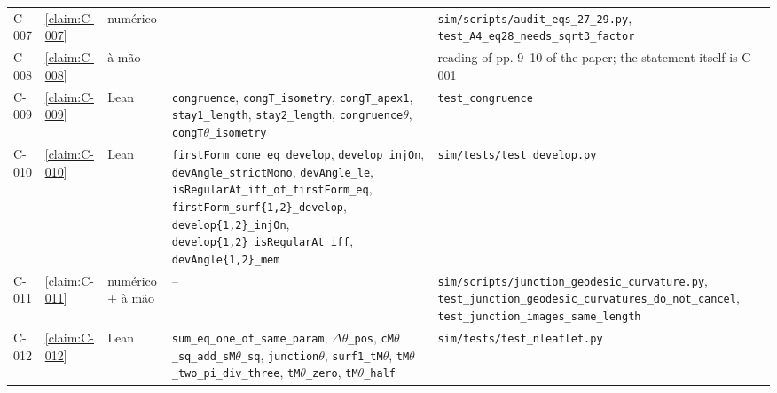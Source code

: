 \begin{longtable}{@{}l>{\raggedright}p{}>{\raggedright}p{}>{\raggedright}p{}>{\raggedright\arraybackslash}p{}@{}}
C-007 & \cref{claim:C-007} & numérico & -- & \texttt{sim/\allowbreak{}scripts/\allowbreak{}audit\_\allowbreak{}eqs\_\allowbreak{}27\_\allowbreak{}29.\allowbreak{}py}, \texttt{test\_\allowbreak{}A4\_\allowbreak{}eq28\_\allowbreak{}needs\_\allowbreak{}sqrt3\_\allowbreak{}factor}\\
C-008 & \cref{claim:C-008} & à mão & -- & reading of pp.\allowbreak{} 9–10 of the paper; the statement itself is C-001\\
C-009 & \cref{claim:C-009} & Lean & \texttt{congruence}, \texttt{congT\_\allowbreak{}isometry}, \texttt{congT\_\allowbreak{}apex1}, \texttt{stay1\_\allowbreak{}length}, \texttt{stay2\_\allowbreak{}length}, \texttt{congruence\ensuremath{\theta}}, \texttt{congT\ensuremath{\theta}\_\allowbreak{}isometry} & \texttt{test\_\allowbreak{}congruence}\\
C-010 & \cref{claim:C-010} & Lean & \texttt{firstForm\_\allowbreak{}cone\_\allowbreak{}eq\_\allowbreak{}develop}, \texttt{develop\_\allowbreak{}injOn}, \texttt{devAngle\_\allowbreak{}strictMono}, \texttt{devAngle\_\allowbreak{}le}, \texttt{isRegularAt\_\allowbreak{}iff\_\allowbreak{}of\_\allowbreak{}firstForm\_\allowbreak{}eq}, \texttt{firstForm\_\allowbreak{}surf\{1,2\}\_\allowbreak{}develop}, \texttt{develop\{1,2\}\_\allowbreak{}injOn}, \texttt{develop\{1,2\}\_\allowbreak{}isRegularAt\_\allowbreak{}iff}, \texttt{devAngle\{1,2\}\_\allowbreak{}mem} & \texttt{sim/\allowbreak{}tests/\allowbreak{}test\_\allowbreak{}develop.\allowbreak{}py}\\
C-011 & \cref{claim:C-011} & numérico + à mão & -- & \texttt{sim/\allowbreak{}scripts/\allowbreak{}junction\_\allowbreak{}geodesic\_\allowbreak{}curvature.\allowbreak{}py}, \texttt{test\_\allowbreak{}junction\_\allowbreak{}geodesic\_\allowbreak{}curvatures\_\allowbreak{}do\_\allowbreak{}not\_\allowbreak{}cancel}, \texttt{test\_\allowbreak{}junction\_\allowbreak{}images\_\allowbreak{}same\_\allowbreak{}length}\\
C-012 & \cref{claim:C-012} & Lean & \texttt{sum\_\allowbreak{}eq\_\allowbreak{}one\_\allowbreak{}of\_\allowbreak{}same\_\allowbreak{}param}, \texttt{\ensuremath{\Delta}\ensuremath{\theta}\_\allowbreak{}pos}, \texttt{cM\ensuremath{\theta}\_\allowbreak{}sq\_\allowbreak{}add\_\allowbreak{}sM\ensuremath{\theta}\_\allowbreak{}sq}, \texttt{junction\ensuremath{\theta}}, \texttt{surf1\_\allowbreak{}tM\ensuremath{\theta}}, \texttt{tM\ensuremath{\theta}\_\allowbreak{}two\_\allowbreak{}pi\_\allowbreak{}div\_\allowbreak{}three}, \texttt{tM\ensuremath{\theta}\_\allowbreak{}zero}, \texttt{tM\ensuremath{\theta}\_\allowbreak{}half} & \texttt{sim/\allowbreak{}tests/\allowbreak{}test\_\allowbreak{}nleaflet.\allowbreak{}py}\\

\end{longtable}
